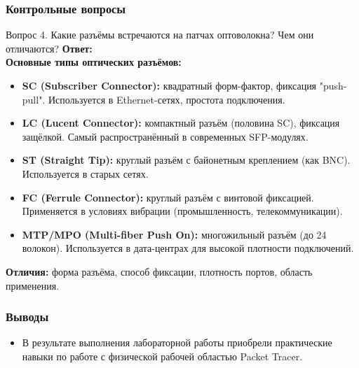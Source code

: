 \begin{frame}
\frametitle{Контрольные вопросы}

\begin{block}{Вопрос 4. Какие разъёмы встречаются на патчах оптоволокна? Чем они отличаются?}
\textbf{Ответ:} \\
\textbf{Основные типы оптических разъёмов:}
\begin{itemize}
    \item \textbf{SC (Subscriber Connector):} квадратный форм-фактор, фиксация "push-pull". Используется в Ethernet-сетях, простота подключения.
    \item \textbf{LC (Lucent Connector):} компактный разъём (половина SC), фиксация защёлкой. Самый распространённый в современных SFP-модулях.
    \item \textbf{ST (Straight Tip):} круглый разъём с байонетным креплением (как BNC). Используется в старых сетях.
    \item \textbf{FC (Ferrule Connector):} круглый разъём с винтовой фиксацией. Применяется в условиях вибрации (промышленность, телекоммуникации).
    \item \textbf{MTP/MPO (Multi-fiber Push On):} многожильный разъём (до 24 волокон). Используется в дата-центрах для высокой плотности подключений.
\end{itemize}
\textbf{Отличия:} форма разъёма, способ фиксации, плотность портов, область применения.
\end{block}

\end{frame}

\begin{frame}
\frametitle{Выводы}
\begin{itemize}
    \item В результате выполнения лабораторной работы приобрели практические навыки по работе с физической рабочей областью Packet Tracer.
\end{itemize}
\end{frame}


